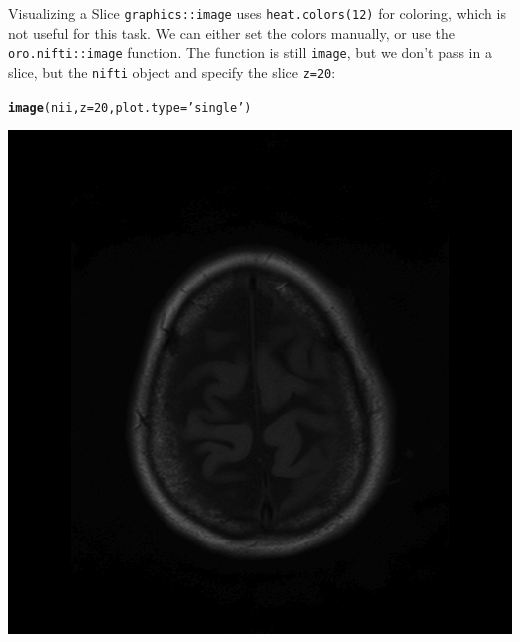 \documentclass[11pt]{beamer}\usepackage[]{graphicx}\usepackage[]{color}
\makeatletter
\newcommand{\hlnum}[1]{\textcolor[rgb]{0.686,0.059,0.569}{#1}}%
\newcommand{\hlstr}[1]{\textcolor[rgb]{0.192,0.494,0.8}{#1}}%
\newcommand{\hlstd}[1]{\textcolor[rgb]{0.345,0.345,0.345}{#1}}%
\newcommand{\hlkwc}[1]{\textcolor[rgb]{0.333,0.667,0.333}{#1}}%
\newcommand{\hlkwd}[1]{\textcolor[rgb]{0.737,0.353,0.396}{\textbf{#1}}}%
\newenvironment{kframe}{%
 \def\at@end@of@kframe{}%
 \ifinner\ifhmode%
  \def\at@end@of@kframe{\end{minipage}}%
  \begin{minipage}{\columnwidth}%
 \fi\fi%
 \def\FrameCommand##1{\hskip\@totalleftmargin \hskip-\fboxsep
 \colorbox{shadecolor}{##1}\hskip-\fboxsep
     \hskip-\linewidth \hskip-\@totalleftmargin \hskip\columnwidth}%
 \MakeFramed {\advance\hsize-\width
   \@totalleftmargin\z@ \linewidth\hsize
   \@setminipage}}%
 {\par\unskip\endMakeFramed%
 \at@end@of@kframe}
\newenvironment{knitrout}{}{} %
\newcommand {\framedgraphic}[2] {
    \begin{frame}{#1}
        \begin{center}
            \texttt{[image: \#2]}
        \end{center}
    \end{frame}
}
\makeatother
\begin{document}
\begin{frame}[fragile]{Visualizing a Slice}
\verb|graphics::image| uses \verb|heat.colors(12)| for coloring, which is not useful for this task.  We can either set the colors manually, or use the \verb|oro.nifti::image| function.  The function is still \verb|image|, but we don't pass in a  slice, but the \verb|nifti| object and specify the slice \verb|z=20|:

\begin{center}
\begin{knitrout}
\color{fgcolor}\begin{kframe}
\begin{alltt}
\hlkwd{image}\hlstd{(nii,} \hlkwc{z} \hlstd{=} \hlnum{20}\hlstd{,} \hlkwc{plot.type}\hlstd{=}\hlstr{'single'}\hlstd{)}
\end{alltt}
\end{kframe}
\includegraphics[width=\textwidth,height=0.5\textheight,keepaspectratio]{figure/image_nifti-1} 

\end{knitrout}
\end{center}


\end{frame}
\end{document}
